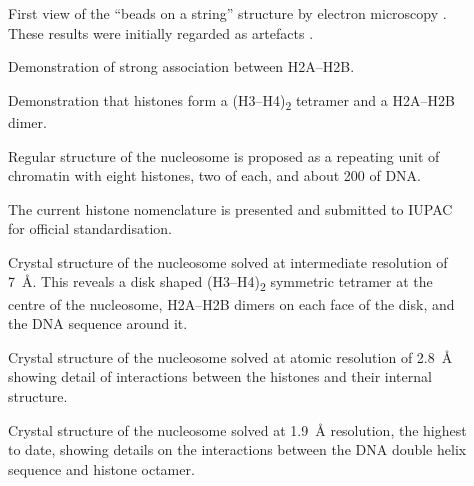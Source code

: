 {\begin{shaded}
\begin{description}
          \item[\cite{olins1974-nu-bodies}]
            First view of the ``beads on a string'' structure
            by electron microscopy .
            These results were initially
            regarded as artefacts \citep{pardon-wilkins-1972model}.

          \item[\cite{anna-isenberg-1974-h2a-h2b}]
            Demonstration of strong association between H2A--H2B.

          \item[\cite{kornberg1974-results}]
            Demonstration that histones form a (H3--H4)\textsubscript{2} tetramer
            and a H2A--H2B dimer.

          \item[\cite{kornberg1974-model}]
            Regular structure of the nucleosome is proposed as a repeating
            unit of chromatin with eight histones, two of each, and about
            \SI{200}{\bp} of DNA.

          \item[\cite{bradbury1975-histone-nomenclature}]
            The current histone nomenclature is presented
            and submitted to IUPAC for official standardisation.

          \item[\cite{richmond1984-7angstrom}]
            Crystal structure of the nucleosome solved at intermediate
            resolution of \SI{7}{\angstrom}.
            This reveals a disk shaped (H3--H4)\textsubscript{2} symmetric
            tetramer at the centre of the nucleosome, H2A--H2B dimers
            on each face of the disk, and the DNA sequence around it.

          \item[\cite{Luger1997structure}]
            Crystal structure of the nucleosome solved at atomic
            resolution of \SI{2.8}{\angstrom} showing detail of interactions
            between the histones and their internal structure.

          \item[\cite{richmond-1kx5-19ansgtrom}]
            Crystal structure of the nucleosome solved at
            \SI{1.9}{\angstrom} resolution, the
            highest to date, showing details on the interactions
            between the DNA double helix sequence and histone octamer.
          \end{description}
        \end{shaded}
      }

